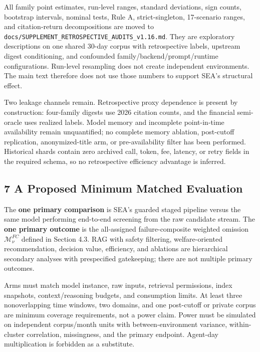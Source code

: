 \documentclass[
  11pt]{article}
\begin{document}
All family point estimates, run-level ranges, standard deviations, sign
counts, bootstrap intervals, nominal tests, Rule A, strict-singleton,
17-scenario ranges, and citation-return decompositions are moved to
\texttt{docs/SUPPLEMENT\_RETROSPECTIVE\_AUDITS\_v1.16.md}. They are
exploratory descriptions on one shared 30-day corpus with retrospective
labels, upstream digest conditioning, and confounded
family/backend/prompt/runtime configurations. Run-level resampling does
not create independent environments. The main text therefore does not
use those numbers to support SEA's structural effect.

Two leakage channels remain. Retrospective proxy dependence is present
by construction: four-family digests use 2026 citation counts, and the
financial semi-oracle uses realized labels. Model memory and incomplete
point-in-time availability remain unquantified; no complete memory
ablation, post-cutoff replication, anonymized-title arm, or
pre-availability filter has been performed. Historical shards contain
zero archived call, token, fee, latency, or retry fields in the required
schema, so no retrospective efficiency advantage is inferred.

\subsection{7 A Proposed Minimum Matched
Evaluation}\label{a-proposed-minimum-matched-evaluation}

The \textbf{one primary comparison} is SEA's guarded staged pipeline
versus the same model performing end-to-end screening from the raw
candidate stream. The \textbf{one primary outcome} is the all-assigned
failure-composite weighted omission \(\mathcal M^{FC}_{\nu}\) defined in
Section 4.3. RAG with safety filtering, welfare-oriented recommendation,
decision value, efficiency, and ablations are hierarchical secondary
analyses with prespecified gatekeeping; there are not multiple primary
outcomes.

Arms must match model instance, raw inputs, retrieval permissions, index
snapshots, context/reasoning budgets, and consumption limits. At least
three nonoverlapping time windows, two domains, and one post-cutoff or
private corpus are minimum coverage requirements, not a power claim.
Power must be simulated on independent corpus/month units with
between-environment variance, within-cluster correlation, missingness,
and the primary endpoint. Agent-day multiplication is forbidden as a
substitute.
\end{document}
